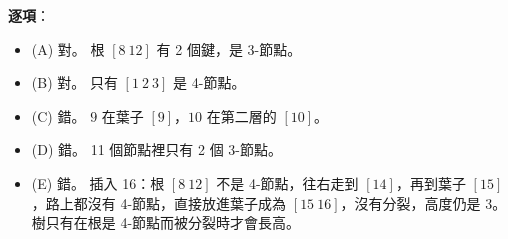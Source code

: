 \begin{pastsoln}
\textbf{逐項}：
\begin{itemize}
\item (A) 對。 根 $[8\ 12]$ 有 2 個鍵，是 3-節點。
\item (B) 對。 只有 $[1\ 2\ 3]$ 是 4-節點。
\item (C) 錯。 $9$ 在葉子 $[9]$，$10$ 在第二層的 $[10]$。
\item (D) 錯。 11 個節點裡只有 2 個 3-節點。
\item (E) 錯。 插入 16：根 $[8\ 12]$ 不是 4-節點，往右走到 $[14]$，再到葉子 $[15]$，路上都沒有 4-節點，直接放進葉子成為
$[15\ 16]$，沒有分裂，高度仍是 3。 樹只有在根是 4-節點而被分裂時才會長高。
\end{itemize}
\end{pastsoln}
